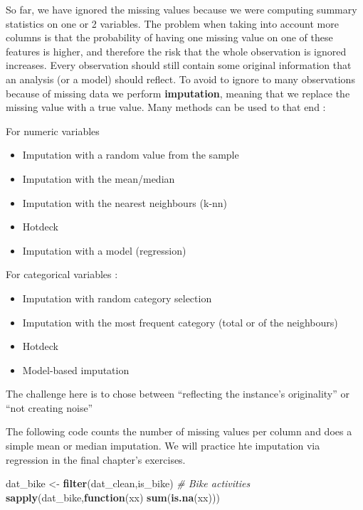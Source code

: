 \documentclass[
]{book}
\newenvironment{Shaded}{\begin{snugshade}}{\end{snugshade}}
\newcommand{\CommentTok}[1]{\textcolor[rgb]{0.56,0.35,0.01}{\textit{#1}}}
\newcommand{\ControlFlowTok}[1]{\textcolor[rgb]{0.13,0.29,0.53}{\textbf{#1}}}
\newcommand{\KeywordTok}[1]{\textcolor[rgb]{0.13,0.29,0.53}{\textbf{#1}}}
\newcommand{\NormalTok}[1]{#1}
\newcommand{\StringTok}[1]{\textcolor[rgb]{0.31,0.60,0.02}{#1}}
\providecommand{\tightlist}{%
  \setlength{\itemsep}{0pt}\setlength{\parskip}{0pt}}
\begin{document}
So far, we have ignored the missing values because we were computing summary statistics on one or 2 variables. The problem when taking into account more columns is that the probability of having one missing value on one of these features is higher, and therefore the risk that the whole observation is ignored increases. Every observation should still contain some original information that an analysis (or a model) should reflect. To avoid to ignore to many observations because of missing data we perform \textbf{imputation}, meaning that we replace the missing value with a true value. Many methods can be used to that end :

For numeric variables

\begin{itemize}
\tightlist
\item
  Imputation with a random value from the sample
\item
  Imputation with the mean/median
\item
  Imputation with the nearest neighbours (k-nn)
\item
  Hotdeck
\item
  Imputation with a model (regression)
\end{itemize}

For categorical variables :

\begin{itemize}
\tightlist
\item
  Imputation with random category selection
\item
  Imputation with the most frequent category (total or of the neighbours)
\item
  Hotdeck
\item
  Model-based imputation
\end{itemize}

The challenge here is to chose between ``reflecting the instance's originality'' or ``not creating noise''

The following code counts the number of missing values per column and does a simple mean or median imputation. We will practice hte imputation via regression in the final chapter's exercises.

\begin{Shaded}
\begin{Highlighting}[]
\NormalTok{dat_bike <-}\StringTok{ }\KeywordTok{filter}\NormalTok{(dat_clean,is_bike) }\CommentTok{# Bike activities}
\KeywordTok{sapply}\NormalTok{(dat_bike,}\ControlFlowTok{function}\NormalTok{(xx) }\KeywordTok{sum}\NormalTok{(}\KeywordTok{is.na}\NormalTok{(xx)))}
\end{Highlighting}
\end{Shaded}
\end{document}
